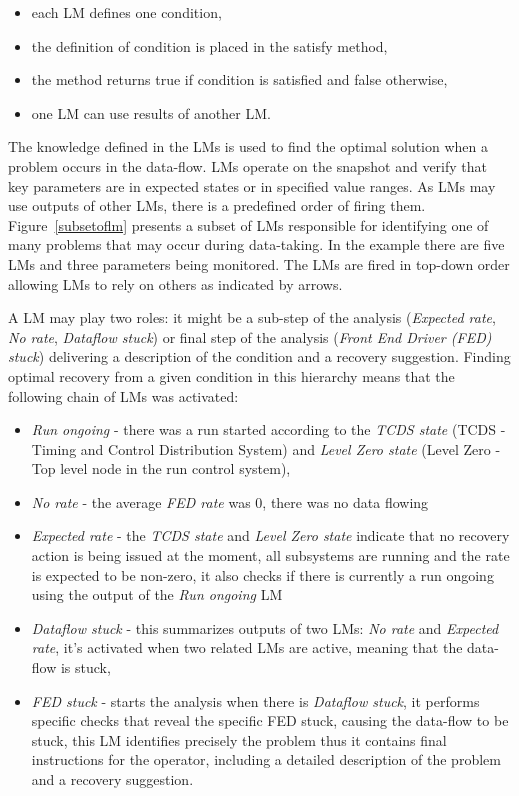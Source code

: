 \documentclass[a4paper]{jpconf}
\begin{document}
\begin{itemize}
\itemsep0em
\item each LM defines one condition,
\item the definition of condition is placed in the satisfy method,
\item the method returns true if condition is satisfied and false otherwise,
\item one LM can use results of another LM.
\end{itemize}

The knowledge defined in the LMs is used to find the optimal solution when a problem occurs in the data-flow. LMs operate on the snapshot and verify that key parameters are in expected states or in specified value ranges. As LMs may use outputs of other LMs, there is a predefined order of firing them. Figure~\ref{subsetoflm} presents a subset of LMs responsible for identifying one of many problems that may occur during data-taking. In the example there are five LMs and three parameters being monitored. The LMs are fired in top-down order allowing LMs to rely on others as indicated by arrows.


A LM may play two roles: it might be a sub-step of the analysis ({\it Expected rate}, {\it No rate}, {\it Dataflow stuck}) or final step of the analysis ({\it Front End Driver (FED) stuck}) delivering a description of the condition and a recovery suggestion. Finding optimal recovery from a given condition in this hierarchy means that the following chain of LMs was activated:

\begin{itemize}
\item {\it Run ongoing} -  there was a run started according to the {\it TCDS state} (TCDS - Timing and Control Distribution System) and{ \it Level Zero state} (Level Zero - Top level node in the run control system),
\item{\it No rate} - the average {\it FED rate} was 0, there was no data flowing
\item{\it Expected rate} - the {\it TCDS state}  and {\it Level Zero state} indicate that no recovery action is being issued at the moment, all subsystems are running and the rate is expected to be non-zero, it also checks if there is currently a run ongoing using the output of the {\it Run ongoing} LM
\item {\it Dataflow stuck} - this summarizes outputs of two LMs: {\it No rate} and {\it Expected rate}, it's activated when two related LMs are active, meaning that the data-flow is stuck,
\item {\it FED stuck} - starts the analysis when there is {\it Dataflow stuck}, it performs specific checks that reveal the specific FED stuck, causing the data-flow to be stuck, this LM identifies precisely the problem thus it contains final instructions for the operator, including a detailed description of the problem and a recovery suggestion.
\end{itemize}
\end{document}
